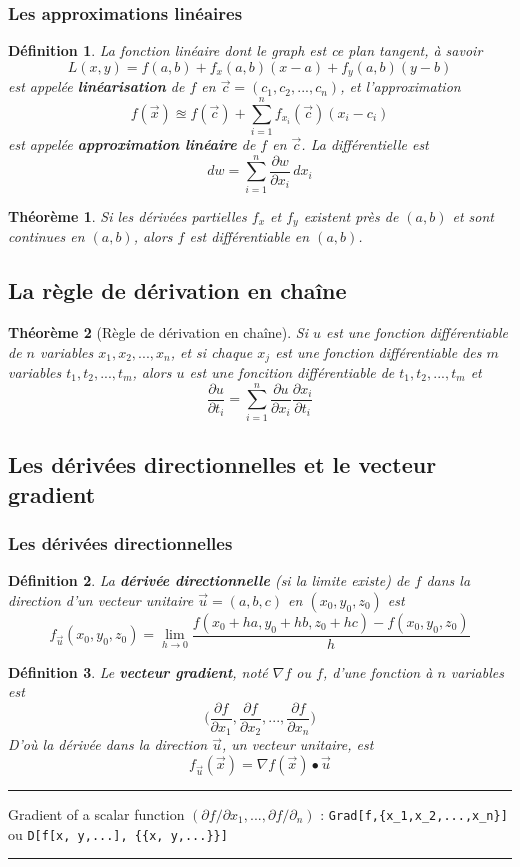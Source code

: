 \documentclass{article}[babel]
\newtheorem{mydef}{Définition}
\newtheorem{mythm}{Théorème}
\newcounter{code}
\newenvironment{code}[1]
	{\index{#1}\refstepcounter{code}\rule{1ex}{1ex}\hspace{\stretch{1}} }
	{ \hspace{\stretch{1}}\rule{1ex}{1ex} }
\begin{document}
		\subsubsection*{Les approximations linéaires}
			\begin{mydef}
				La fonction linéaire dont le graph est ce plan tangent, à savoir \[L(x,y)=f(a,b)+f_x(a,b)(x-a)+f_y(a,b)(y-b)\]
				est appelée \textbf{linéarisation} de $f$ en $\vec{c}=(c_1,c_2,...,c_n)$, et l'approximation
				\[f(\vec{x})\approxeq f(\vec{c})+\sum_{i=1}^n f_{x_i}(\vec{c})(x_i-c_i)\]
				est appelée \textbf{approximation linéaire} de $f$ en $\vec{c}$. La différentielle est \[dw=\sum_{i=1}^{n}\frac{\partial w}{\partial x_i}\,dx_i\]
			\end{mydef}
			\begin{mythm}
				Si les dérivées partielles $f_x$ et $f_y$ existent près de $(a,b)$ et sont continues en $(a,b)$, alors $f$ est différentiable en $(a,b)$.
			\end{mythm}
	\subsection{La règle de dérivation en chaîne}
		\begin{mythm}[Règle de dérivation en chaîne]
			Si $u$ est une fonction différentiable de $n$ variables $x_1,x_2,...,x_n$, et si chaque $x_j$ est une fonction différentiable des $m$ variables $t_1,t_2,...,t_m$, alors $u$ est une foncition différentiable de $t_1,t_2,...,t_m$ et
			\[\frac{\partial u}{\partial t_i}=\sum_{i=1}^{n}\frac{\partial u}{\partial x_i}\frac{\partial x_i}{\partial t_i}\] 
		\end{mythm}
	\subsection{Les dérivées directionnelles et le vecteur gradient}
		\subsubsection*{Les dérivées directionnelles}
			\begin{mydef}
				La \textbf{dérivée directionnelle} (si la limite existe) de $f$ dans la direction d'un vecteur unitaire $\vec{u}=(a,b,c)$ en $(x_0,y_0,z_0)$ est \[f_{\vec{u}}(x_0,y_0,z_0)=\lim_{h\to 0}\frac{f(x_0+ha,y_0+hb,z_0+hc)-f(x_0,y_0,z_0)}{h}\]
			\end{mydef}
			\begin{mydef}
				Le \textbf{vecteur gradient}, noté $\nabla f$ ou  $f$, d'une fonction à $n$ variables est \[\Big(\frac{\partial f}{\partial x_1},\frac{\partial f}{\partial x_2},...,\frac{\partial f}{\partial x_n}\Big)\]
				D'où la dérivée dans la direction $\vec{u}$, un vecteur unitaire, est \[f_{\vec{u}}(\vec{x})=\nabla f(\vec{x})\bullet \vec{u}\]
			\end{mydef}
			\begin{code}{Gradient}
			Gradient of a scalar function $(\partial f / \partial x_1,...,\partial f / \partial _n)$ : \verb|Grad[f,{x_1,x_2,...,x_n}]| ou \verb|D[f[x, y,...], {{x, y,...}}]|
		\end{code}
\end{document}
